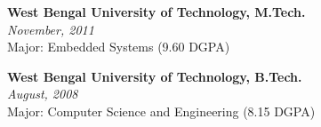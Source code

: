 \documentclass[10pt, a4paper]{article}
\begin{document}
 \vspace*{-2mm}
 
 \noindent    \textbf{West Bengal University of Technology, M.Tech.}\\
    \textit{November, 2011}\\
    Major: Embedded Systems (9.60 DGPA)\\
    
   
    \vspace*{-2mm}
    
    \noindent
    \textbf{West Bengal University of Technology, B.Tech.}\\
    \textit{August, 2008}\\
    Major: Computer Science and Engineering (8.15 DGPA)\\
    
    
    \vspace*{-7mm}	
       		
\end{document}
